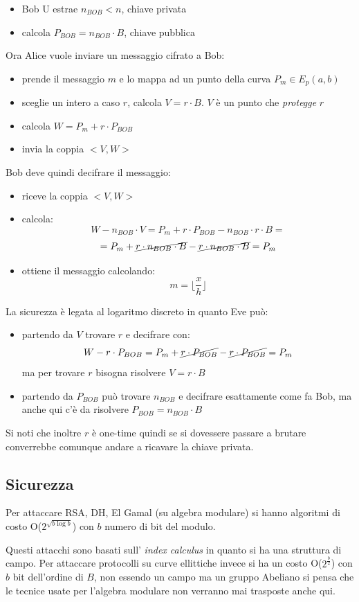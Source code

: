 \begin{itemize}
    \item Bob U estrae $n_{BOB} < n$, chiave privata
    \item calcola $P_{BOB} = n_{BOB} \cdot B$, chiave pubblica
\end{itemize}

Ora Alice vuole inviare un messaggio cifrato a Bob:
\begin{itemize}
    \item prende il messaggio $m$ e lo mappa ad un punto della curva $P_m \in E_p(a,b)$
    \item sceglie un intero a caso $r$, calcola $V = r \cdot B$. $V$ è un punto che \emph{protegge} $r$
    \item calcola $W = P_m + r \cdot P_{BOB}$
    \item invia la coppia $<V,W>$
\end{itemize}

Bob deve quindi decifrare il messaggio:
\begin{itemize}
    \item riceve la coppia $<V,W>$
    \item calcola:
        $$ W -n_{BOB} \cdot V = P_m + r \cdot P_{BOB} - n_{BOB} \cdot r \cdot B = $$
        $$ = P_m + \cancel{r \cdot n_{BOB} \cdot B} - \cancel{r \cdot n_{BOB} \cdot B} = P_m$$
    \item ottiene il messaggio calcolando:
        $$ m = \lfloor \frac{x}{h} \rfloor $$
\end{itemize}

La sicurezza è legata al logaritmo discreto in quanto Eve può:
\begin{itemize}
    \item partendo da $V$ trovare $r$ e decifrare con:
    $$W - r\cdot P_{BOB} = P_m + \cancel{r \cdot P_{BOB}} - \cancel{r \cdot P_{BOB}} = P_m$$
    ma per trovare $r$ bisogna risolvere $V = r \cdot B$
    
    \item partendo da $P_{BOB}$ può trovare $n_{BOB}$ e decifrare esattamente come fa Bob, ma anche qui c'è da risolvere $P_{BOB} = n_{BOB} \cdot B$
\end{itemize}

Si noti che inoltre $r$ è one-time quindi se si dovessere passare a brutare converrebbe comunque andare a ricavare la chiave privata.

\subsection{Sicurezza}
Per attaccare RSA, DH, El Gamal (su algebra modulare) si hanno algoritmi di costo O($2^{\sqrt{b \log b}}$) con $b$ numero di bit del modulo.

Questi attacchi sono basati sull' \emph{index calculus} in quanto si ha una struttura di campo.
Per attaccare protocolli su curve ellittiche invece si ha un costo O($2^{\frac{b}{2}}$) con $b$ bit dell'ordine di $B$, non essendo un campo ma un gruppo Abeliano si pensa che le tecnice usate per l'algebra modulare non verranno mai trasposte anche qui.